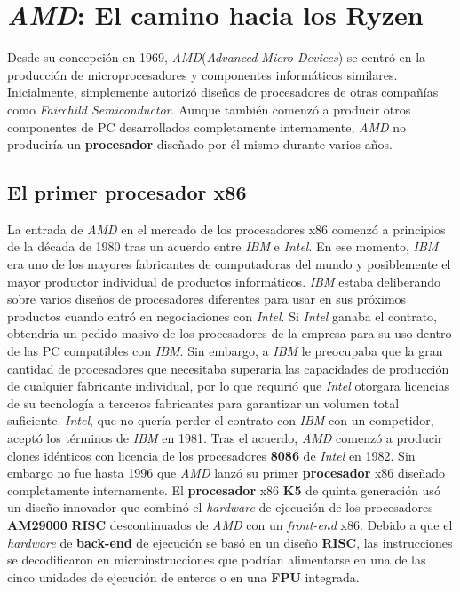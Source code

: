 \section{\emph{AMD}: El camino hacia los \textbf{Ryzen}}
Desde su concepción en 1969, \emph{AMD}(\emph{Advanced Micro Devices}) se centró en la producción de microprocesadores y componentes informáticos similares. Inicialmente,
simplemente autorizó diseños de procesadores de otras compañías como \emph{Fairchild Semiconductor}. Aunque también comenzó a producir otros componentes de PC desarrollados
completamente internamente, \emph{AMD} no produciría un \textbf{procesador} diseñado por él mismo durante varios años. 

\subsection{El primer \textbf{procesador} x86}
La entrada de \emph{AMD} en el mercado de los procesadores x86 comenzó a principios de la década de 1980 tras un acuerdo entre \emph{IBM} e \emph{Intel}. En ese momento, \emph{IBM}
era uno de los mayores fabricantes de computadoras del mundo y posiblemente el mayor productor individual de productos informáticos. \emph{IBM} estaba deliberando sobre varios diseños
de procesadores diferentes para usar en sus próximos productos cuando entró en negociaciones con \emph{Intel}. Si \emph{Intel} ganaba el contrato, obtendría un pedido masivo de los
procesadores de la empresa para su uso dentro de las PC compatibles con \emph{IBM}. Sin embargo, a \emph{IBM} le preocupaba que la gran cantidad de procesadores que necesitaba
superaría las capacidades de producción de cualquier fabricante individual, por lo que requirió que \emph{Intel} otorgara licencias de su tecnología a terceros fabricantes
para garantizar un volumen total suficiente. \emph{Intel}, que no quería perder el contrato con \emph{IBM} con un competidor, aceptó los términos de \emph{IBM} en 1981. Tras el acuerdo,
\emph{AMD} comenzó a producir clones idénticos con licencia de los procesadores \textbf{8086} de \emph{Intel} en 1982. Sin embargo no fue hasta 1996 que \emph{AMD} lanzó su primer
\textbf{procesador} x86 diseñado completamente internamente. El \textbf{procesador} x86 \textbf{K5} de quinta generación usó un diseño innovador que combinó el \emph{hardware} de
ejecución de los procesadores \textbf{AM29000} \textbf{RISC} descontinuados de \emph{AMD} con un \emph{front-end} x86. Debido a que el \emph{hardware} de \textbf{back-end} de ejecución
se basó en un diseño \textbf {RISC}, las instrucciones se decodificaron en microinstrucciones que podrían alimentarse en una de las cinco unidades de ejecución de enteros o en una
\textbf{FPU} integrada. 

